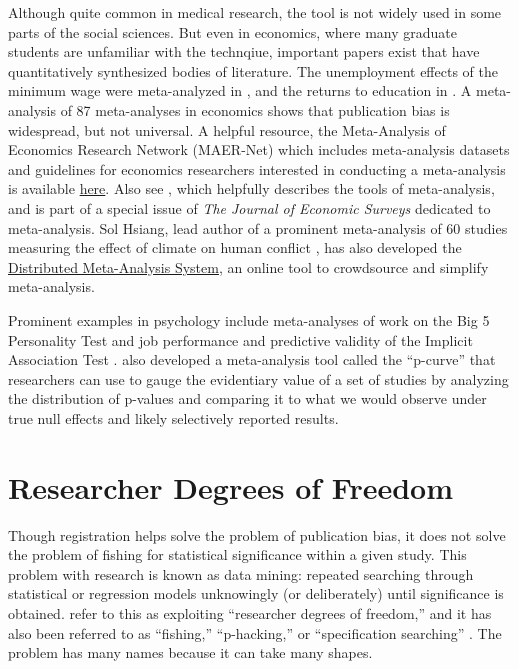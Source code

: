 \documentclass[12pt] {article}
\begin{document}
Although quite common in medical research, the tool is not widely used in some parts of the social sciences. But even in economics, where many graduate students are unfamiliar with the technqiue, important papers exist that have quantitatively synthesized bodies of literature. The unemployment effects of the minimum wage were meta-analyzed in \cite{card1995time}, and the returns to education in \cite{ashenfelter1999review}. A meta-analysis of 87 meta-analyses in economics shows that publication bias is widespread, but not universal. A helpful resource, the Meta-Analysis of Economics Research Network (MAER-Net) which includes meta-analysis datasets and guidelines for economics researchers interested in conducting a meta-analysis is available \href{https://www.hendrix.edu/maer-network/}{here}. Also see \cite{stanley2005beyond}, which helpfully describes the tools of meta-analysis, and is part of a special issue of \textit{The Journal of Economic Surveys} dedicated to meta-analysis. Sol Hsiang, lead author of a prominent meta-analysis of 60 studies measuring the effect of climate on human conflict \citep{hsiang2013climate}, has also developed the \href{http://dmas.berkeley.edu}{Distributed Meta-Analysis System}, an online tool to crowdsource and simplify meta-analysis.

Prominent examples in psychology include meta-analyses of work on the Big 5 Personality Test and job performance \citep{barrick1991big5} and predictive validity of the Implicit Association Test \citep{greenwald2009understanding}. \cite{simonsohn2014p} also developed a meta-analysis tool called the ``p-curve'' that researchers can use to gauge the evidentiary value of a set of studies by analyzing the distribution of p-values and comparing it to what we would observe under true null effects and likely selectively reported results.

\section{Researcher Degrees of
Freedom}\label{rdof}

Though registration helps solve the problem of publication bias, it does
not solve the problem of fishing for statistical significance within a
given study. This problem with research is known as data mining: repeated searching through statistical or regression
models unknowingly (or deliberately) until significance is obtained.
 \cite{simmons_false-positive_2011} refer to this as exploiting 
``researcher degrees of freedom,'' and it has also been referred to as
``fishing,'' ``p-hacking,'' or ``specification searching'' \citep{humphreys_fishing_2013}. The problem has many names because it can take many shapes. 
\end{document}
